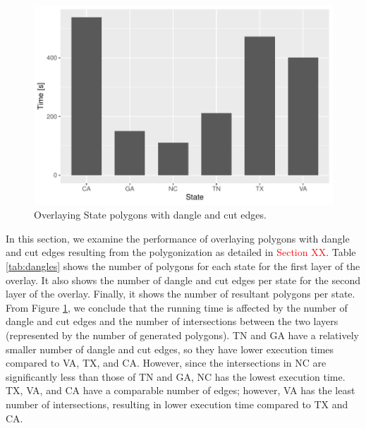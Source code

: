 \begin{figure}
    \centering
    \includegraphics[width=0.7\linewidth]{chapterSDCEL/states.pdf}
    \caption{Overlaying State polygons with dangle and cut edges.}
    \label{fig:dangle}
\end{figure}

In this section, we examine the performance of overlaying polygons with dangle and cut edges resulting from the polygonization as detailed in \textcolor{red}{Section XX}.  Table \ref{tab:dangles} shows the number of polygons for each state for the first layer of the overlay. It also shows the number of dangle and cut edges per state for the second layer of the overlay. Finally, it shows the number of resultant polygons per state.  From Figure \ref{fig:dangle}, we conclude that the running time is affected by the number of dangle and cut edges and the number of intersections between the two layers (represented by the number of generated polygons).  TN and GA have a relatively smaller number of dangle and cut edges, so they have lower execution times compared to VA, TX, and CA. However, since the intersections in NC are significantly less than those of TN and GA, NC has the lowest execution time. TX, VA, and CA have a comparable number of edges; however, VA has the least number of intersections, resulting in lower execution time compared to TX and CA.
